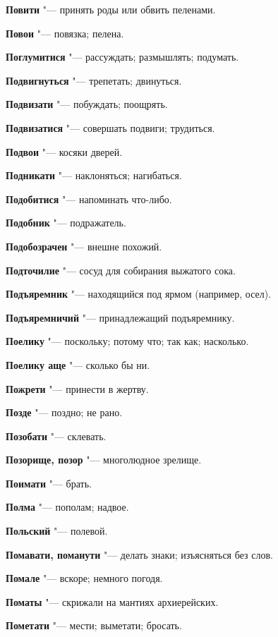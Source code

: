 \begin{mymulticols}
\noindent\textbf{Повити} "--- принять роды или обвить пеленами. 

\noindent\textbf{Повои} "--- повязка; пелена. 

\noindent\textbf{Поглумитися} "--- рассуждать; размышлять; подумать. 

\noindent\textbf{Подвигнуться} "--- трепетать; двинуться. 

\noindent\textbf{Подвизати} "--- побуждать; поощрять. 

\noindent\textbf{Подвизатися} "--- совершать подвиги; трудиться. 

\noindent\textbf{Подвои} "--- косяки дверей. 

\noindent\textbf{Подникати} "--- наклоняться; нагибаться. 

\noindent\textbf{Подобитися} "--- напоминать что-либо. 

\noindent\textbf{Подобник} "--- подражатель. 

\noindent\textbf{Подобозрачен} "--- внешне похожий. 

\noindent\textbf{Подточилие} "--- сосуд для собирания выжатого сока. 

\noindent\textbf{Подъяремник} "--- находящийся под ярмом (например, осел). 

\noindent\textbf{Подъяремничий} "--- принадлежащий подъяремнику. 

\noindent\textbf{Поелику} "--- поскольку; потому что; так как; насколько. 

\noindent\textbf{Поелику аще} "--- сколько бы ни. 

\noindent\textbf{Пожрети} "--- принести в жертву. 

\noindent\textbf{Позде} "--- поздно; не рано. 

\noindent\textbf{Позобати} "--- склевать. 

\noindent\textbf{Позорище, позор} "--- многолюдное зрелище. 

\noindent\textbf{Поимати} "--- брать. 

\noindent\textbf{Полма} "--- пополам; надвое. 

\noindent\textbf{Польский} "--- полевой. 

\noindent\textbf{Помавати, поманути} "--- делать знаки; изъясняться без слов. 

\noindent\textbf{Помале} "--- вскоре; немного погодя. 

\noindent\textbf{Поматы} "--- скрижали на мантиях архиерейских. 

\noindent\textbf{Пометати} "--- мести; выметати; бросать. 


\end{mymulticols}

